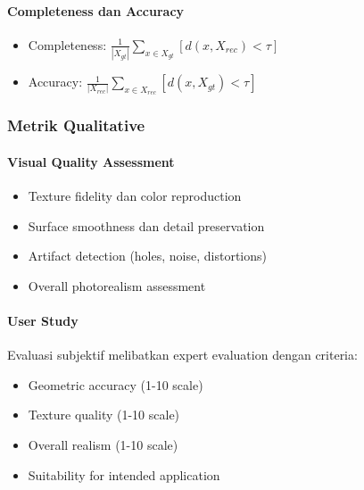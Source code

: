 \documentclass[12pt,a4paper]{article}
\begin{document}
\paragraph{Completeness dan Accuracy}
\begin{itemize}
    \item Completeness: $\frac{1}{|X_{gt}|} \sum_{x \in X_{gt}} [d(x, X_{rec}) < \tau]$
    \item Accuracy: $\frac{1}{|X_{rec}|} \sum_{x \in X_{rec}} [d(x, X_{gt}) < \tau]$
\end{itemize}

\subsubsection{Metrik Qualitative}

\paragraph{Visual Quality Assessment}
\begin{itemize}
    \item Texture fidelity dan color reproduction
    \item Surface smoothness dan detail preservation
    \item Artifact detection (holes, noise, distortions)
    \item Overall photorealism assessment
\end{itemize}

\paragraph{User Study}
Evaluasi subjektif melibatkan expert evaluation dengan criteria:
\begin{itemize}
    \item Geometric accuracy (1-10 scale)
    \item Texture quality (1-10 scale)
    \item Overall realism (1-10 scale)
    \item Suitability for intended application
\end{itemize}


\end{document}
